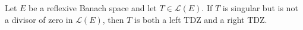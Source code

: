 Let $E$ be a reflexive Banach space and let $T \in \mathcal{L}(E)$. If $T$ is singular but is not a divisor of zero in $\mathcal{L}(E)$, then $T$ is both a left TDZ and a right TDZ.
